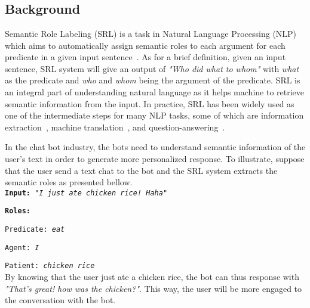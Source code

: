\chapter{\babSatu}


\section{Background}
	
Semantic Role Labeling (SRL) is a task in Natural Language Processing (NLP) which aims to automatically assign semantic roles to each argument for each predicate in a given input sentence~\citep{jurafsky2016speech}. As for a brief definition, given an input sentence, SRL system will give an output of \textit{"Who did what to whom"} with \textit{what} as the predicate and \textit{who} and \textit{whom} being the argument of the predicate. SRL is an integral part of understanding natural language as it helps machine to retrieve semantic information from the input. In practice, SRL has been widely used as one of the intermediate steps for many NLP tasks, some of which are information extraction~\citep{emanuele2013textual, surdeanu2003using}, machine translation~\citep{liu2010semantic, lo2013improving}, and question-answering~\citep{shen2007using, moschitti2003open}.

In the chat bot industry, the bots need to understand semantic information of the user's text in order to generate more personalized response. To illustrate, suppose that the user send a text chat to the bot and the SRL system extracts the semantic roles as presented bellow.
\\

\texttt{\textbf{Input:} 
\textit{"I just ate chicken rice! Haha"}}

\texttt{\textbf{Roles:}}

\texttt{Predicate: \textit{eat}}

\texttt{Agent: \textit{I}}

\texttt{Patient: \textit{chicken rice}}
\\

By knowing that the user just ate a chicken rice, the bot can thus response with \textit{"That's great! how was the chicken?"}. This way, the user will be more engaged to the conversation with the bot.

